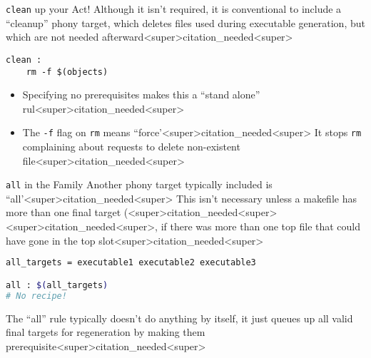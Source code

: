 \documentclass[11pt]{beamer}
\begin{document}
\begin{frame}[fragile=singleslide]{\texttt{clean} up your Act!}
Although it isn't required, it is conventional to include a ``cleanup'' phony target, which deletes files used during executable generation, but which are not needed afterward<super>citation_needed<super>  
\begin{lstlisting}[style=terminal]
clean : 
	rm -f $(objects)
\end{lstlisting}
\begin{itemize}
\item Specifying no prerequisites makes this a ``stand alone'' rul<super>citation_needed<super>
\item The \texttt{-f} flag on \texttt{rm} means ``force'<super>citation_needed<super>  It stops \texttt{rm} complaining about requests to delete non-existent file<super>citation_needed<super>
\end{itemize}
\end{frame}

\begin{frame}[fragile=singleslide]{\texttt{all} in the Family}
Another phony target typically included is ``all'<super>citation_needed<super>  This isn't necessary unless a makefile has more than one final target (<super>citation_needed<super><super>citation_needed<super>, if there was more than one top file that could have gone in the top slot<super>citation_needed<super>  
\begin{lstlisting}[style = terminal, language=bash]
all_targets = executable1 executable2 executable3

all : $(all_targets)
# No recipe! 
\end{lstlisting}
The ``all'' rule typically doesn't do anything by itself, it just queues up all valid final targets for regeneration by making them prerequisite<super>citation_needed<super>  
\end{frame}
\end{document}
